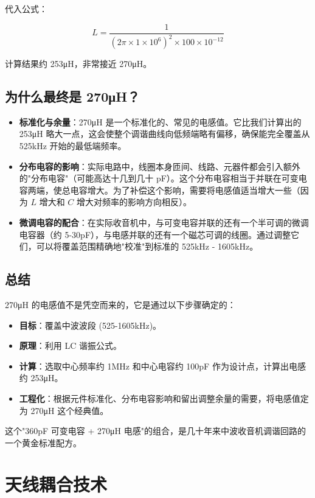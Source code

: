 \documentclass[12pt,UTF8]{ctexbook}
\begin{document}
代入公式：

\[ L = \frac{1}{(2\pi \times 1 \times 10^6)^2 \times 100 \times 10^{-12}} \]

计算结果约 253μH，非常接近 270μH。

\section{为什么最终是 270μH？}

\begin{itemize}[leftmargin=2cm]
	\item \textbf{标准化与余量}：270μH 是一个标准化的、常见的电感值。它比我们计算出的 253μH 略大一点，这会使整个调谐曲线向低频端略有偏移，确保能完全覆盖从 525kHz 开始的最低端频率。
	\item \textbf{分布电容的影响}：实际电路中，线圈本身匝间、线路、元器件都会引入额外的"分布电容"（可能高达十几到几十 pF）。这个分布电容相当于并联在可变电容两端，使总电容增大。为了补偿这个影响，需要将电感值适当增大一些（因为 \( L \) 增大和 \( C \) 增大对频率的影响方向相反）。
	\item \textbf{微调电容的配合}：在实际收音机中，与可变电容并联的还有一个半可调的微调电容器（约 5-30pF），与电感并联的还有一个磁芯可调的线圈。通过调整它们，可以将覆盖范围精确地"校准"到标准的 525kHz - 1605kHz。
\end{itemize}

\section{总结}

270μH 的电感值不是凭空而来的，它是通过以下步骤确定的：

\begin{itemize}[leftmargin=2cm]
	\item \textbf{目标}：覆盖中波波段 (525-1605kHz)。
	\item \textbf{原理}：利用 LC 谐振公式。
	\item \textbf{计算}：选取中心频率约 1MHz 和中心电容约 100pF 作为设计点，计算出电感约 253μH。
	\item \textbf{工程化}：根据元件标准化、分布电容影响和留出调整余量的需要，将电感值定为 270μH 这个经典值。
\end{itemize}

这个"360pF 可变电容 + 270μH 电感"的组合，是几十年来中波收音机调谐回路的一个黄金标准配方。


\chapter{天线耦合技术}
\label{chap:antenna-coupling}
\end{document}
